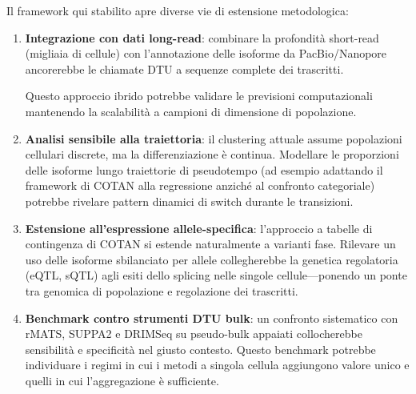 Il framework qui stabilito apre diverse vie di estensione metodologica:
\begin{enumerate}
    \item \textbf{Integrazione con dati long-read}: combinare la profondità short-read (migliaia di cellule) con l'annotazione delle isoforme da PacBio/Nanopore ancorerebbe le chiamate DTU a sequenze complete dei trascritti.

Questo approccio ibrido potrebbe validare le previsioni computazionali mantenendo la scalabilità a campioni di dimensione di popolazione.

    \item \textbf{Analisi sensibile alla traiettoria}: il clustering attuale assume popolazioni cellulari discrete, ma la differenziazione è continua. Modellare le proporzioni delle isoforme lungo traiettorie di pseudotempo (ad esempio adattando il framework di COTAN alla regressione anziché al confronto categoriale) potrebbe rivelare pattern dinamici di switch durante le transizioni.

    \item \textbf{Estensione all'espressione allele-specifica}: l'approccio a tabelle di contingenza di COTAN si estende naturalmente a varianti fase. Rilevare un uso delle isoforme sbilanciato per allele collegherebbe la genetica regolatoria (eQTL, sQTL) agli esiti dello splicing nelle singole cellule---ponendo un ponte tra genomica di popolazione e regolazione dei trascritti.

    \item \textbf{Benchmark contro strumenti DTU bulk}: un confronto sistematico con rMATS, SUPPA2 e DRIMSeq \cite{love2018swimming, draper2025selecting} su pseudo-bulk appaiati collocherebbe sensibilità e specificità nel giusto contesto. Questo benchmark potrebbe individuare i regimi in cui i metodi a singola cellula aggiungono valore unico e quelli in cui l'aggregazione è sufficiente.
\end{enumerate}

